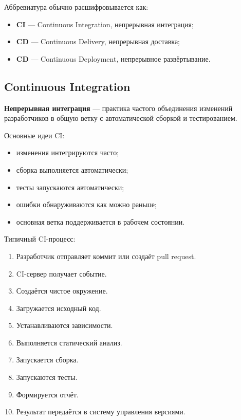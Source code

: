 \documentclass[12pt,a4paper]{article}
\begin{document}
Аббревиатура обычно расшифровывается как:

\begin{itemize}
    \item \textbf{CI} --- Continuous Integration, непрерывная интеграция;
    \item \textbf{CD} --- Continuous Delivery, непрерывная доставка;
    \item \textbf{CD} --- Continuous Deployment, непрерывное развёртывание.
\end{itemize}

\subsection{Continuous Integration}

\textbf{Непрерывная интеграция} --- практика частого объединения изменений разработчиков в общую ветку с автоматической сборкой и тестированием.

Основные идеи CI:

\begin{itemize}
    \item изменения интегрируются часто;
    \item сборка выполняется автоматически;
    \item тесты запускаются автоматически;
    \item ошибки обнаруживаются как можно раньше;
    \item основная ветка поддерживается в рабочем состоянии.
\end{itemize}

Типичный CI-процесс:

\begin{enumerate}
    \item Разработчик отправляет коммит или создаёт pull request.
    \item CI-сервер получает событие.
    \item Создаётся чистое окружение.
    \item Загружается исходный код.
    \item Устанавливаются зависимости.
    \item Выполняется статический анализ.
    \item Запускается сборка.
    \item Запускаются тесты.
    \item Формируется отчёт.
    \item Результат передаётся в систему управления версиями.
\end{enumerate}
\end{document}
